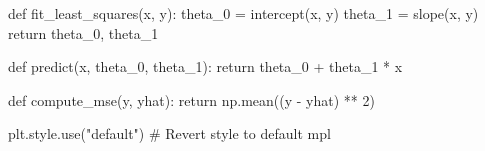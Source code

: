 \documentclass[
  letterpaper,
  DIV=11,
  numbers=noendperiod]{scrreprt}
\newenvironment{Shaded}{\begin{snugshade}}{\end{snugshade}}
\newcommand{\CommentTok}[1]{\textcolor[rgb]{0.37,0.37,0.37}{#1}}
\newcommand{\ControlFlowTok}[1]{\textcolor[rgb]{0.00,0.23,0.31}{#1}}
\newcommand{\DecValTok}[1]{\textcolor[rgb]{0.68,0.00,0.00}{#1}}
\newcommand{\KeywordTok}[1]{\textcolor[rgb]{0.00,0.23,0.31}{#1}}
\newcommand{\NormalTok}[1]{\textcolor[rgb]{0.00,0.23,0.31}{#1}}
\newcommand{\OperatorTok}[1]{\textcolor[rgb]{0.37,0.37,0.37}{#1}}
\newcommand{\StringTok}[1]{\textcolor[rgb]{0.13,0.47,0.30}{#1}}
\begin{document}
\begin{Shaded}
\begin{Highlighting}[]
\KeywordTok{def}\NormalTok{ fit\_least\_squares(x, y):}
\NormalTok{    theta\_0 }\OperatorTok{=}\NormalTok{ intercept(x, y)}
\NormalTok{    theta\_1 }\OperatorTok{=}\NormalTok{ slope(x, y)}
    \ControlFlowTok{return}\NormalTok{ theta\_0, theta\_1}


\KeywordTok{def}\NormalTok{ predict(x, theta\_0, theta\_1):}
    \ControlFlowTok{return}\NormalTok{ theta\_0 }\OperatorTok{+}\NormalTok{ theta\_1 }\OperatorTok{*}\NormalTok{ x}


\KeywordTok{def}\NormalTok{ compute\_mse(y, yhat):}
    \ControlFlowTok{return}\NormalTok{ np.mean((y }\OperatorTok{{-}}\NormalTok{ yhat) }\OperatorTok{**} \DecValTok{2}\NormalTok{)}


\NormalTok{plt.style.use(}\StringTok{"default"}\NormalTok{)  }\CommentTok{\# Revert style to default mpl}
\end{Highlighting}
\end{Shaded}
\end{document}
